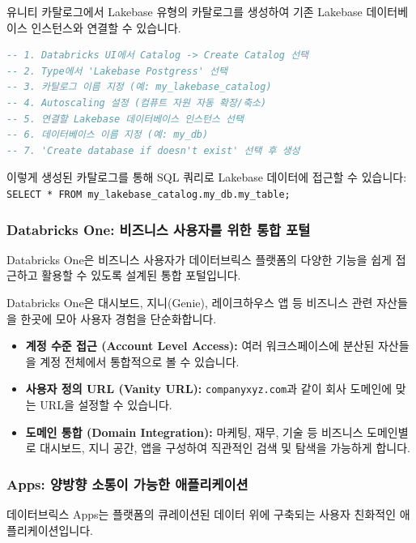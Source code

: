 \documentclass[11pt,a4paper]{article}
\theoremstyle{definition}
\begin{document}
\begin{tcolorbox}[example={Lakebase 카탈로그 생성 예시}]
유니티 카탈로그에서 Lakebase 유형의 카탈로그를 생성하여 기존 Lakebase 데이터베이스 인스턴스와 연결할 수 있습니다.
\begin{lstlisting}[language=SQL, caption=Lakebase 카탈로그 생성 과정]
-- 1. Databricks UI에서 Catalog -> Create Catalog 선택
-- 2. Type에서 'Lakebase Postgress' 선택
-- 3. 카탈로그 이름 지정 (예: my_lakebase_catalog)
-- 4. Autoscaling 설정 (컴퓨트 자원 자동 확장/축소)
-- 5. 연결할 Lakebase 데이터베이스 인스턴스 선택
-- 6. 데이터베이스 이름 지정 (예: my_db)
-- 7. 'Create database if doesn't exist' 선택 후 생성
\end{lstlisting}
이렇게 생성된 카탈로그를 통해 SQL 쿼리로 Lakebase 데이터에 접근할 수 있습니다: \texttt{SELECT * FROM my_lakebase_catalog.my_db.my_table;}
\end{tcolorbox}

\subsubsection{Databricks One: 비즈니스 사용자를 위한 통합 포털}
Databricks One은 비즈니스 사용자가 데이터브릭스 플랫폼의 다양한 기능을 쉽게 접근하고 활용할 수 있도록 설계된 통합 포털입니다.

\begin{tcolorbox}[summary={Databricks One의 특징}]
Databricks One은 대시보드, 지니(Genie), 레이크하우스 앱 등 비즈니스 관련 자산들을 한곳에 모아 사용자 경험을 단순화합니다.
\end{tcolorbox}

\begin{itemize}
    \item \textbf{계정 수준 접근 (Account Level Access):} 여러 워크스페이스에 분산된 자산들을 계정 전체에서 통합적으로 볼 수 있습니다.
    \item \textbf{사용자 정의 URL (Vanity URL):} \texttt{companyxyz.com}과 같이 회사 도메인에 맞는 URL을 설정할 수 있습니다.
    \item \textbf{도메인 통합 (Domain Integration):} 마케팅, 재무, 기술 등 비즈니스 도메인별로 대시보드, 지니 공간, 앱을 구성하여 직관적인 검색 및 탐색을 가능하게 합니다.
\end{itemize}

\subsubsection{Apps: 양방향 소통이 가능한 애플리케이션}
데이터브릭스 Apps는 플랫폼의 큐레이션된 데이터 위에 구축되는 사용자 친화적인 애플리케이션입니다.
\end{document}
